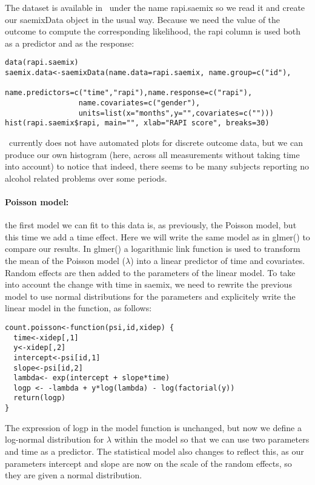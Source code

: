 The dataset is available in \monolix~under the name {\sf rapi.saemix} so we read it and create our saemixData object in the usual way. Because we need the value of the outcome to compute the corresponding likelihood, the {\sf rapi} column is used both as a predictor and as the response:
\begin{verbatim}
data(rapi.saemix)
saemix.data<-saemixData(name.data=rapi.saemix, name.group=c("id"),
                 name.predictors=c("time","rapi"),name.response=c("rapi"),
                 name.covariates=c("gender"),
                 units=list(x="months",y="",covariates=c("")))
hist(rapi.saemix$rapi, main="", xlab="RAPI score", breaks=30)
\end{verbatim}
\monolix~currently does not have automated plots for discrete outcome data, but we can produce our own histogram (here, across all measurements without taking time into account) to notice that indeed, there seems to be many subjects reporting no alcohol related problems over some periods.

\paragraph{Poisson model:} the first model we can fit to this data is, as previously, the Poisson model, but this time we add a time effect. Here we will write the same model as in {\sf glmer()} to compare our results. In {\sf glmer()} a logarithmic link function is used to transform the mean of the Poisson model ($\lambda$) into a linear predictor of time and covariates. Random effects are then added to the parameters of the linear model. To take into account the change with time in {\sf saemix}, we need to rewrite the previous model to use normal distributions for the parameters and explicitely write the linear model in the function, as follows:
\begin{verbatim}
count.poisson<-function(psi,id,xidep) { 
  time<-xidep[,1]
  y<-xidep[,2]
  intercept<-psi[id,1]
  slope<-psi[id,2]
  lambda<- exp(intercept + slope*time)
  logp <- -lambda + y*log(lambda) - log(factorial(y))
  return(logp)
}
\end{verbatim}
The expression of logp in the model function is unchanged, but now we define a log-normal distribution for $\lambda$ within the model so that we can use two parameters and time as a predictor. The statistical model also changes to reflect this, as our parameters intercept and slope are now on the scale of the random effects, so they are given a normal distribution. 

